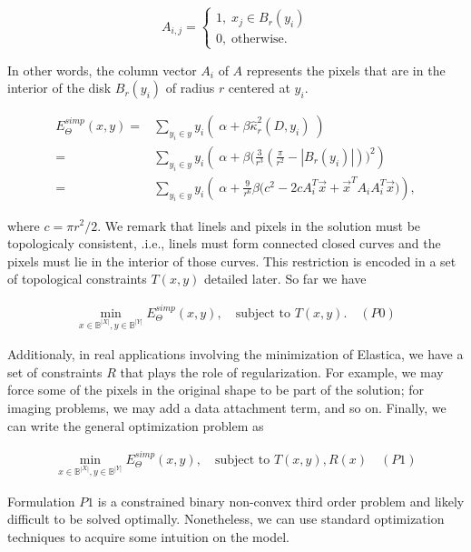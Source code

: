 \[
	A_{i,j} = \left\{ \begin{array}{ll}
		1,\; x_j \in B_{r}(y_i)\\
		0,\; \text{otherwise}.
	\end{array}\right.
\]

In other words, the column vector $A_i$ of $A$ represents the pixels that are in the interior of  the disk $B_{r}(y_i)$ of radius $r$ centered at $y_i$. 


\begin{align}
	E_{\Theta}^{simp}(x,y) =& \sum_{y_i \in y}{ y_i \left(\; \alpha + \beta \hat{\kappa}_{r}^2(D,y_i) \; \right)}\\\nonumber
			   =& \sum_{y_i \in y}{ y_i \left(\; \alpha  + \beta \big( \frac{3}{r^3}(\frac{\pi}{r^2} - |B_r(y_i)|)\big)^2\right)}\\\nonumber
			   =& \sum_{y_i \in y}{ y_i \left(\; \alpha + \frac{9}{r^6}\beta \big(c^2 - 2cA_i^T\vec{x} + \vec{x}^TA_iA_i^T\vec{x}\big)\right)},			   
	\end{align}
	
where $c =  \pi r^2/2$. We remark that linels and pixels in the solution must be topologicaly consistent, .i.e., linels must form connected closed curves and the pixels must lie in the interior of those curves. This restriction is encoded in a set of topological constraints $T(x,y)$ detailed later. So far we have

\begin{align*}
	\min_{x \in \mathbb{B}^{|X|}, y \in \mathbb{B}^{|Y|}}{E_{\Theta}^{simp}(x,y)}, \quad \text{subject to } T(x,y). \quad (P0)
\end{align*}

Additionaly, in real applications involving the minimization of Elastica, we have a set of constraints $R$ that plays the role of regularization. For example, we may force some of the pixels in the original shape to be part of the solution; for imaging problems, we may add a data attachment term, and so on. Finally, we can write the general optimization problem as

\begin{align*}
	\min_{x \in \mathbb{B}^{|X|}, y \in \mathbb{B}^{|Y|}}{E_{\Theta}^{simp}(x,y)}, \quad \text{subject to } T(x,y), R(x) \quad (P1)
\end{align*}

	Formulation $P1$ is a constrained binary non-convex third order problem and likely difficult to be solved optimally. Nonetheless, we can use standard optimization techniques to acquire some intuition on the model. 	
	
